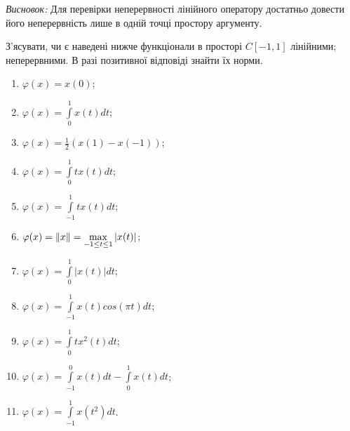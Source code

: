 \begin{theory}
    \emph{Висновок:} Для перевірки неперервності лінійного оператору достатньо 
    довести його неперервність лише в одній точці простору аргументу.
\end{theory}

\begin{exercise}
    З'ясувати, чи є наведені нижче функціонали в просторі $C{\left[-1, 1\right]}$ лінійними; 
    неперервними. В разі позитивної відповіді знайти їх норми. 
    \begin{enumerate}[label=\ukr*)]
        \item $\varphi(x) = x(0)$;
        \item $\varphi(x) = \int\limits_0^1x(t)dt$;
        \item $\varphi(x) = \frac{1}{2}(x(1) - x(-1))$;
        \item $\varphi(x) = \int\limits_0^1tx(t)dt$;
        \item $\varphi(x) = \int\limits_{-1}^1tx(t)dt$;
        \item $\varphi(x) = \left\lVert x\right\rVert = \max\limits_{-1 \leq t \leq 1} |x(t)|$;
        \item $\varphi(x) = \int\limits_0^1|x(t)|dt$;
        \item $\varphi(x) = \int\limits_{-1}^1x(t)cos(\pi t)dt$;
        \item $\varphi(x) = \int\limits_0^1tx^2(t)dt$;
        \item $\varphi(x) = \int\limits_{-1}^0x(t)dt - \int\limits_0^1x(t)dt$;
        \item $\varphi(x) = \int\limits_{-1}^1x(t^2)dt$.
    \end{enumerate}
\end{exercise}


